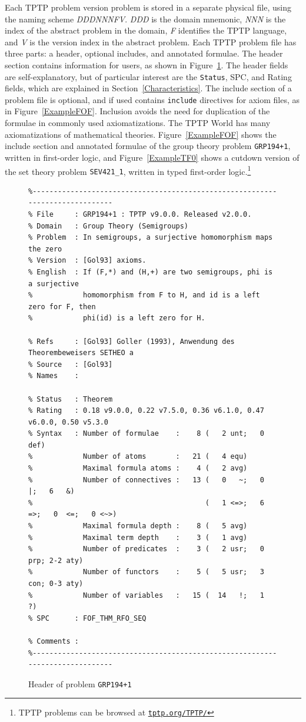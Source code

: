 \documentclass[runningheads]{llncs}
\begin{document}
Each TPTP problem version problem is stored in a separate physical file, using the naming scheme 
{\em DDDNNNFV}.
{\em DDD} is the domain mnemonic, {\em NNN} is the index of the abstract problem in the domain,
{\em F} identifies the TPTP language, and {\em V} is the version index in the abstract problem.
Each TPTP problem file has three parts: a header, optional includes, and annotated formulae.
The header section contains information for users, as shown in Figure~\ref{ExampleHeader}.
The header fields are self-explanatory, but of particular interest are the {\tt Status}, SPC,
and Rating fields, which are explained in Section~\ref{Characteristics}.
The include section of a problem file is optional, and if used contains {\tt include} directives 
for axiom files, as in Figure~\ref{ExampleFOF}.
Inclusion avoids the need for duplication of the formulae in commonly used axiomatizations.
The TPTP World has many axiomatizations of mathematical theories.
Figure~\ref{ExampleFOF} shows the include section and annotated formulae of the group theory 
problem {\tt GRP194+1}, written in first-order logic, and Figure~\ref{ExampleTF0} shows a cutdown 
version of the set theory problem {\tt SEV421\_1}, written in typed first-order logic.\footnote{%
TPTP problems can be browsed at \href{https://tptp.org/TPTP/}{{\tt tptp.org/TPTP/}}}

\begin{figure}[htb]
\centering
{\scriptsize
{\setlength{\baselineskip}{2.5mm}
\begin{verbatim}
%------------------------------------------------------------------------------
% File     : GRP194+1 : TPTP v9.0.0. Released v2.0.0.
% Domain   : Group Theory (Semigroups)
% Problem  : In semigroups, a surjective homomorphism maps the zero
% Version  : [Gol93] axioms.
% English  : If (F,*) and (H,+) are two semigroups, phi is a surjective
%            homomorphism from F to H, and id is a left zero for F, then 
%            phi(id) is a left zero for H.

% Refs     : [Gol93] Goller (1993), Anwendung des Theorembeweisers SETHEO a
% Source   : [Gol93]
% Names    :

% Status   : Theorem
% Rating   : 0.18 v9.0.0, 0.22 v7.5.0, 0.36 v6.1.0, 0.47 v6.0.0, 0.50 v5.3.0
% Syntax   : Number of formulae    :    8 (   2 unt;   0 def)
%            Number of atoms       :   21 (   4 equ)
%            Maximal formula atoms :    4 (   2 avg)
%            Number of connectives :   13 (   0   ~;   0   |;   6   &)
%                                         (   1 <=>;   6  =>;   0  <=;   0 <~>)
%            Maximal formula depth :    8 (   5 avg)
%            Maximal term depth    :    3 (   1 avg)
%            Number of predicates  :    3 (   2 usr;   0 prp; 2-2 aty)
%            Number of functors    :    5 (   5 usr;   3 con; 0-3 aty)
%            Number of variables   :   15 (  14   !;   1   ?)
% SPC      : FOF_THM_RFO_SEQ

% Comments :
%------------------------------------------------------------------------------
\end{verbatim}
}}
\caption{Header of problem {\tt GRP194+1}}
\label{ExampleHeader}
\end{figure}
\end{document}
